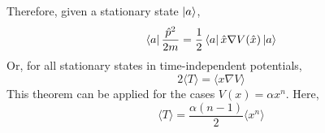 \begin{sol}
\begin{enumerate}[label=\textbf{(\alph*)}]
\begin{equation}
\end{equation}
Therefore, given a stationary state $\ket a$,
\begin{equation}
	\bra a\frac{\hat p^2}{2m}=\frac{1}{2}\bra a\hat x\nabla V(\hat x)\ket a
\end{equation}
Or, for all stationary states in time-independent potentials,
\begin{equation}
	2\langle T\rangle=\langle x\nabla V\rangle
\end{equation} 
This theorem can be applied for the cases $V(x)=\alpha x^n$. Here,
\begin{equation}
	\langle T\rangle=\frac{\alpha(n-1)}{2}\langle x^n\rangle
\end{equation} 
\end{enumerate}
\end{sol}